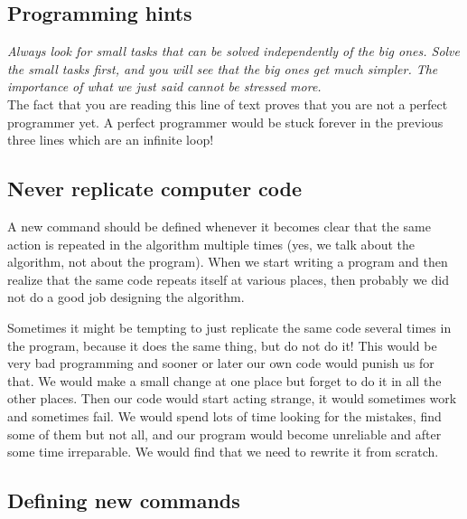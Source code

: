 \subsection{Programming hints}

{\em Always look for small tasks that can be solved independently of the big ones.
Solve the small tasks first, and you will see that the big ones get much simpler. The 
importance of what we just said cannot be stressed more.}\\

\noindent
The fact that you are reading this line of text proves that you are not 
a perfect programmer yet. A perfect programmer would be stuck forever 
in the previous three lines which are an infinite loop!


\subsection{Never replicate computer code}

A new command should be defined whenever it becomes clear that the same 
action is repeated in the algorithm multiple times (yes, we talk about the algorithm,
not about the program). When we start writing a program and then realize that the same
code repeats itself at various places, then probably we did not do a good job 
designing the algorithm.

Sometimes it might be 
tempting to just replicate the same code several times in the 
program, because it does the same thing, but do not do it! This would be very bad programming
and sooner or later our own code would punish us for that. 
We would make a small change at one place but forget to do it 
in all the other places. Then our code would start 
acting strange, it would sometimes work and sometimes fail. 
We would spend lots of time looking for the mistakes, find some 
of them but not all, and our program would become unreliable
and after some time irreparable. We would find that we need to 
rewrite it from scratch.

\subsection{Defining new commands}

